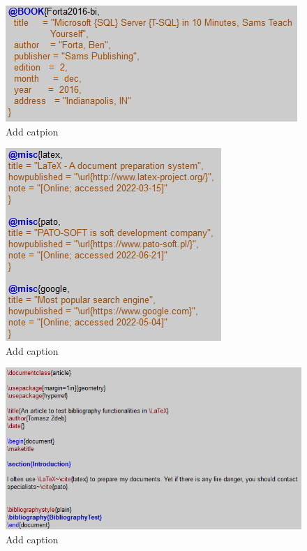 \fbox{\textcolor{red}{FINISH THIS CHAPTER}}

\begin{figure}[H]
\centering
\includegraphics[scale=0.9]{content/LaTeX/figures/biblio_example.png}
\caption{Add catpion}
\label{fig:printglossary} %
\end{figure}

\begin{figure}[H]
\centering
\includegraphics[scale=0.9]{content/LaTeX/figures/biblio_bib.png}
\caption{Add caption}
\label{fig:printglossary} %
\end{figure}

\begin{figure}[H]
\centering
\includegraphics[scale=0.6]{content/LaTeX/figures/biblio_latex.png}
\caption{Add caption}
\label{fig:printglossary} %
\end{figure}


